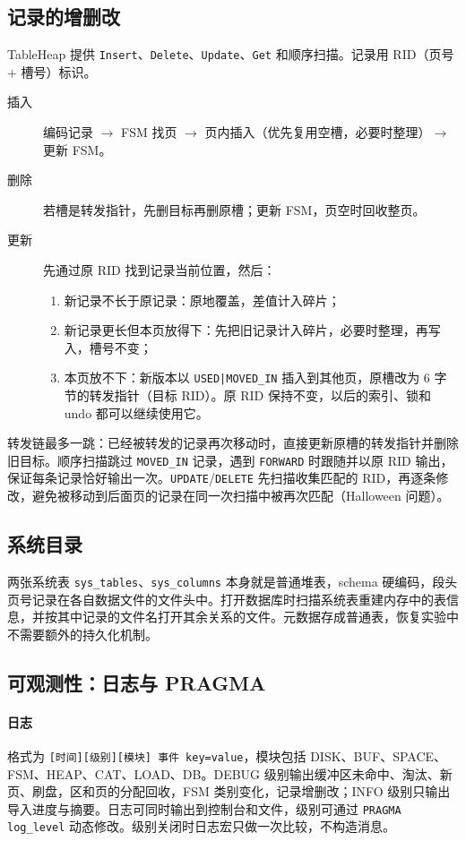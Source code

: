 \documentclass[11pt,a4paper]{ctexart}
\newcommand{\code}[1]{\texttt{#1}}
\begin{document}
\subsection{记录的增删改}

TableHeap 提供 \code{Insert}、\code{Delete}、\code{Update}、\code{Get} 和顺序扫描。记录用 RID（页号 + 槽号）标识。

\begin{description}
  \item[插入] 编码记录 $\rightarrow$ FSM 找页 $\rightarrow$ 页内插入（优先复用空槽，必要时整理）$\rightarrow$ 更新 FSM。
  \item[删除] 若槽是转发指针，先删目标再删原槽；更新 FSM，页空时回收整页。
  \item[更新] 先通过原 RID 找到记录当前位置，然后：
    \begin{enumerate}
      \item 新记录不长于原记录：原地覆盖，差值计入碎片；
      \item 新记录更长但本页放得下：先把旧记录计入碎片，必要时整理，再写入，槽号不变；
      \item 本页放不下：新版本以 \code{USED|MOVED\_IN} 插入到其他页，原槽改为 6 字节的转发指针（目标 RID）。原 RID 保持不变，以后的索引、锁和 undo 都可以继续使用它。
    \end{enumerate}
\end{description}

转发链最多一跳：已经被转发的记录再次移动时，直接更新原槽的转发指针并删除旧目标。顺序扫描跳过 \code{MOVED\_IN} 记录，遇到 \code{FORWARD} 时跟随并以原 RID 输出，保证每条记录恰好输出一次。\code{UPDATE}/\code{DELETE} 先扫描收集匹配的 RID，再逐条修改，避免被移动到后面页的记录在同一次扫描中被再次匹配（Halloween 问题）。

\subsection{系统目录}

两张系统表 \code{sys\_tables}、\code{sys\_columns} 本身就是普通堆表，schema 硬编码，段头页号记录在各自数据文件的文件头中。打开数据库时扫描系统表重建内存中的表信息，并按其中记录的文件名打开其余关系的文件。元数据存成普通表，恢复实验中不需要额外的持久化机制。

\subsection{可观测性：日志与 PRAGMA}

\paragraph{日志} 格式为 \code{[时间][级别][模块] 事件 key=value}，模块包括 DISK、BUF、SPACE、FSM、HEAP、CAT、LOAD、DB。DEBUG 级别输出缓冲区未命中、淘汰、新页、刷盘，区和页的分配回收，FSM 类别变化，记录增删改；INFO 级别只输出导入进度与摘要。日志可同时输出到控制台和文件，级别可通过 \code{PRAGMA log\_level} 动态修改。级别关闭时日志宏只做一次比较，不构造消息。
\end{document}
